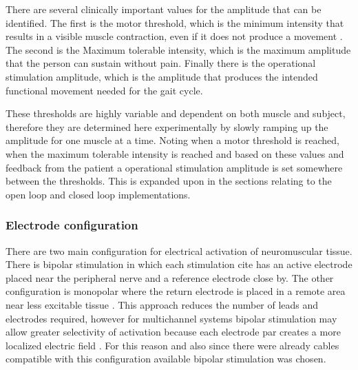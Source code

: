 There are several clinically important values for the amplitude that can be identified. The first is the motor threshold, which is the minimum intensity  that results in a visible muscle contraction, even if it does not produce a movement \cite{marquez-chin_functional_2020}. The second is the Maximum tolerable intensity, which is the maximum amplitude that the person can sustain without pain. Finally there is the operational stimulation amplitude, which is the amplitude that produces the intended functional movement needed for the gait cycle. 

These thresholds are highly variable and dependent on both muscle and subject, therefore they are determined here experimentally by slowly ramping up the amplitude for one muscle at a time. Noting when a motor threshold is reached, when the maximum tolerable intensity is reached and based on these values and feedback from the patient a operational stimulation amplitude is set somewhere between the thresholds. This is expanded upon in the sections relating to the open loop and closed loop implementations.

\subsubsection{Electrode configuration}
There are two main configuration for electrical activation of neuromuscular tissue. There is bipolar stimulation in which each stimulation cite has an active electrode placed near the peripheral nerve and a reference electrode close by. The other configuration is monopolar where the return electrode is placed in a remote area near less excitable tissue \cite{peckham_functional_2005}. 
This approach reduces the number of leads and electrodes required, however for multichannel systems bipolar stimulation may allow greater selectivity of activation because each electrode par creates a more localized electric field \cite{grandjean_recruitment_1986}. For this reason and also since there were already cables compatible with this configuration available bipolar stimulation was chosen.



















